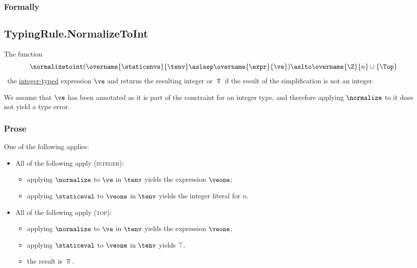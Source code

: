 \subsubsection{Formally}

\subsection{TypingRule.NormalizeToInt \label{sec:TypingRule.NormalizeToInt}}
\hypertarget{def-normalizetoint}{}
The function
\[
\normalizetoint(
  \overname{\staticenvs}{\tenv} \aslsep
  \overname{\expr}{\ve}
) \aslto \overname{\Z}{n} \cup \{\Top\}
\]
\symbolicallysimplifies\ the \underline{integer-typed} expression $\ve$ and returns the resulting integer or $\Top$ if
the result of the simplification is not an integer.

We assume that $\ve$ has been annotated as it is part of the constraint for an integer type,
and therefore applying $\normalize$ to it does not yield a type error.

\subsubsection{Prose}
One of the following applies:
\begin{itemize}
  \item All of the following apply (\textsc{integer}):
  \begin{itemize}
    \item applying $\normalize$ to $\ve$ in $\tenv$ yields the expression $\veone$;
    \item applying $\staticeval$ to $\veone$ in $\tenv$ yields the integer literal for $n$.
  \end{itemize}

  \item All of the following apply (\textsc{top}):
  \begin{itemize}
    \item applying $\normalize$ to $\ve$ in $\tenv$ yields the expression $\veone$;
    \item applying $\staticeval$ to $\veone$ in $\tenv$ yields $\top$.
    \item the result is $\Top$.
  \end{itemize}
\end{itemize}

